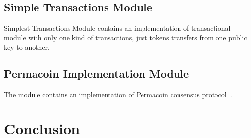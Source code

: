 \documentclass[]{report}   %
\begin{document}
\subsection{Simple Transactions Module}

Simplest Transactions Module contains an implementation of transactional module with only one kind of transactions, just tokens transfers from one public key to another.

\subsection{Permacoin Implementation Module}

The module contains an implementation of Permacoin consensus protocol~\cite{miller2014permacoin}.

\section{Conclusion}



\end{document}
